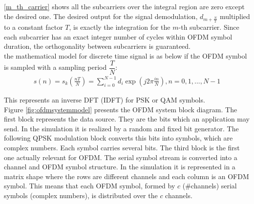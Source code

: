 \ref{m_th_carrier} shows all the subcarriers over the integral region are zero except the desired one. The desired output for the signal demodulation, $d_{m+ \frac{N}{2}}$ multiplied to a constant factor $T$, is exactly the integration for the $m$-th subcarrier. Since each subcarrier has an exact integer number of cycles within OFDM symbol duration, the orthogonality between subcarriers is guaranteed.\\
the mathematical model for discrete time signal is as below if the OFDM symbol is sampled with a sampling period $\dfrac{T}{N}$:
\begin{equation} \label{math_model}
\begin{split}
s(n)= s_{k}(\frac{nT}{N})= \sum\limits_{i=0}^{N-1} d_{i} \exp(j2\pi\frac{in}{N}), n= 0, 1, ... , N-1
\end{split}
\end{equation}

This represents an inverse DFT (IDFT) for PSK or QAM symbols.\\

Figure \ref{fig:ofdmsystemmodel} presents the OFDM system block diagram. The first block represents the data source. They are the bits which an application may send. In the simulation it is realized by a random and fixed bit generator. The following QPSK modulation block converts this bits into symbols, which are complex numbers. Each symbol carries several bits. The third block is the first one actually relevant for OFDM. The serial symbol stream is converted into a channel and OFDM symbol structure. In the simulation it is represented in a matrix shape where the rows are different channels and each column is an OFDM symbol. This means that each OFDM symbol, formed by $c$ (\#channels) serial symbols (complex numbers), is distributed over the $c$ channels.\\

